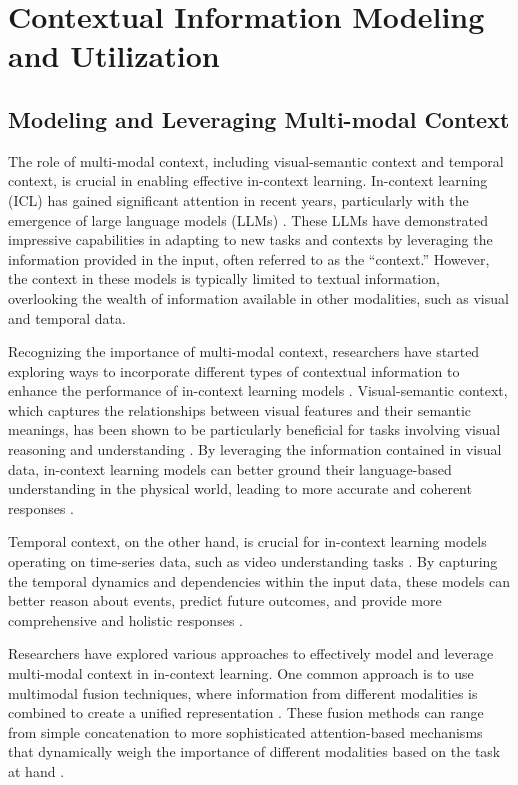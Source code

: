 \documentclass[11pt]{article}
\begin{document}
\section{Contextual Information Modeling and Utilization}

\subsection{Modeling and Leveraging Multi-modal Context}

The role of multi-modal context, including visual-semantic context and temporal context, is crucial in enabling effective in-context learning. In-context learning (ICL) has gained significant attention in recent years, particularly with the emergence of large language models (LLMs) \cite{ref36}. These LLMs have demonstrated impressive capabilities in adapting to new tasks and contexts by leveraging the information provided in the input, often referred to as the ``context.'' However, the context in these models is typically limited to textual information, overlooking the wealth of information available in other modalities, such as visual and temporal data.

Recognizing the importance of multi-modal context, researchers have started exploring ways to incorporate different types of contextual information to enhance the performance of in-context learning models \cite{ref132,ref39}. Visual-semantic context, which captures the relationships between visual features and their semantic meanings, has been shown to be particularly beneficial for tasks involving visual reasoning and understanding \cite{ref125}. By leveraging the information contained in visual data, in-context learning models can better ground their language-based understanding in the physical world, leading to more accurate and coherent responses \cite{ref133}.

Temporal context, on the other hand, is crucial for in-context learning models operating on time-series data, such as video understanding tasks \cite{ref124}. By capturing the temporal dynamics and dependencies within the input data, these models can better reason about events, predict future outcomes, and provide more comprehensive and holistic responses \cite{ref134}.

Researchers have explored various approaches to effectively model and leverage multi-modal context in in-context learning. One common approach is to use multimodal fusion techniques, where information from different modalities is combined to create a unified representation \cite{ref40,ref135}. These fusion methods can range from simple concatenation to more sophisticated attention-based mechanisms that dynamically weigh the importance of different modalities based on the task at hand \cite{ref72}.
\end{document}

